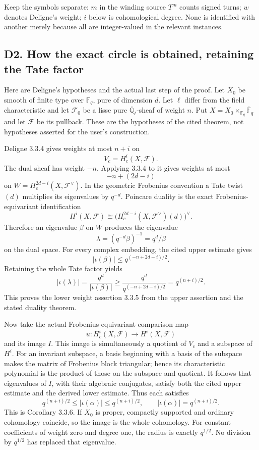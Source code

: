 \documentclass[
  11pt,
]{article}
\begin{document}
Keep the symbols separate: \(m\) in the winding source \(T^m\) counts
signed turns; \(w\) denotes Deligne's weight; \(i\) below is
cohomological degree. None is identified with another merely because all
are integer-valued in the relevant instances.

\subsection{D2. How the exact circle is obtained, retaining the Tate
factor}\label{d2.-how-the-exact-circle-is-obtained-retaining-the-tate-factor}

Here are Deligne's hypotheses and the actual last step of the proof. Let
\(X_0\) be smooth of finite type over \(\mathbb F_q\), pure of dimension
\(d\). Let \(\ell\) differ from the field characteristic and let
\(\mathcal F_0\) be a lisse pure \(\overline{\mathbb Q}_\ell\)-sheaf of
weight \(n\). Put \(X=X_0\times_{\mathbb F_q}\overline{\mathbb F}_q\)
and let \(\mathcal F\) be its pullback. These are the hypotheses of the
cited theorem, not hypotheses asserted for the user's construction.

Deligne 3.3.4 gives weights at most \(n+i\) on \[
V_c=H_c^i(X,\mathcal F).
\] The dual sheaf has weight \(-n\). Applying 3.3.4 to it gives weights
at most \[
-n+(2d-i)
\] on \(W=H_c^{2d-i}(X,\mathcal F^\vee)\). In the geometric Frobenius
convention a Tate twist \((d)\) multiplies its eigenvalues by
\(q^{-d}\). Poincare duality is the exact Frobenius-equivariant
identification \[
H^i(X,\mathcal F)\cong\bigl(H_c^{2d-i}(X,\mathcal F^\vee)(d)\bigr)^\vee.
\] Therefore an eigenvalue \(\beta\) on \(W\) produces the eigenvalue \[
\lambda=(q^{-d}\beta)^{-1}=q^d/\beta
\] on the dual space. For every complex embedding, the cited upper
estimate gives \[
|\iota(\beta)|\le q^{(-n+2d-i)/2}.
\] Retaining the whole Tate factor yields \[
|\iota(\lambda)|
=\frac{q^d}{|\iota(\beta)|}
\ge \frac{q^d}{q^{(-n+2d-i)/2}}
=q^{(n+i)/2}.
\] This proves the lower weight assertion 3.3.5 from the upper assertion
and the stated duality theorem.

Now take the actual Frobenius-equivariant comparison map \[
u:H_c^i(X,\mathcal F)\longrightarrow H^i(X,\mathcal F)
\] and its image \(I\). This image is simultaneously a quotient of
\(V_c\) and a subspace of \(H^i\). For an invariant subspace, a basis
beginning with a basis of the subspace makes the matrix of Frobenius
block triangular; hence its characteristic polynomial is the product of
those on the subspace and quotient. It follows that eigenvalues of
\(I\), with their algebraic conjugates, satisfy both the cited upper
estimate and the derived lower estimate. Thus each satisfies \[
q^{(n+i)/2}\le |\iota(\alpha)|\le q^{(n+i)/2},
\qquad
\boxed{|\iota(\alpha)|=q^{(n+i)/2}.}
\] This is Corollary 3.3.6. If \(X_0\) is proper, compactly supported
and ordinary cohomology coincide, so the image is the whole cohomology.
For constant coefficients of weight zero and degree one, the radius is
exactly \(q^{1/2}\). No division by \(q^{1/2}\) has replaced that
eigenvalue.
\end{document}
